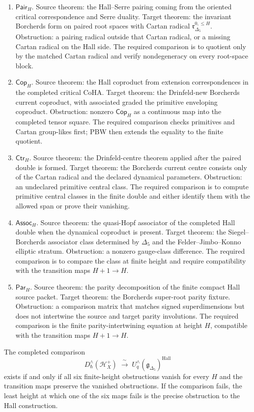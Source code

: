\begin{theorem}
\begin{enumerate}[label=\textup{(\roman*)}]
missing Serre-kernel class in the associated graded. The required comparison is to
identify primitive Hall generators root-by-root and prove that the
kernel is the finite-height Borcherds--Serre ideal.
\item \(\mathsf{Pair}_H\). Source theorem: the Hall--Serre pairing
coming from the oriented critical correspondence and Serre duality.
Target theorem: the invariant Borcherds form on paired root spaces with
Cartan radical \(\mathfrak r^{0,\leq H}_{\Delta_5}\). Obstruction: a
pairing radical outside that Cartan radical, or a missing Cartan radical
on the Hall side. The required comparison is to quotient only by the matched Cartan
radical and verify nondegeneracy on every root-space block.
\item \(\mathsf{Cop}_H\). Source theorem: the Hall coproduct from
extension correspondences in the completed critical CoHA. Target
theorem: the Drinfeld-new Borcherds current coproduct, with associated
graded the primitive enveloping coproduct. Obstruction: nonzero
\(\mathsf{Cop}_H\) as a continuous map into the completed tensor square.
The required comparison checks primitives and Cartan group-likes first; PBW then
extends the equality to the finite quotient.
\item \(\mathsf{Ctr}_H\). Source theorem: the Drinfeld-centre theorem
applied after the paired double is formed. Target theorem: the
Borcherds current centre consists only of the Cartan radical and the
declared dynamical parameters. Obstruction: an undeclared primitive
central class. The required comparison is to compute primitive central classes in the
finite double and either identify them with the allowed span or prove
their vanishing.
\item \(\mathsf{Assoc}_H\). Source theorem: the quasi-Hopf associator
of the completed Hall double when the dynamical coproduct is present.
Target theorem: the Siegel--Borcherds associator class determined by
\(\Delta_5\) and the Felder--Jimbo--Konno elliptic stratum. Obstruction:
a nonzero gauge-class difference. The required comparison is to compare the class at
finite height and require compatibility with the transition maps
\(H+1\to H\).
\item \(\mathsf{Par}_H\). Source theorem: the parity decomposition of
the finite compact Hall source packet. Target theorem: the Borcherds
super-root parity fixture. Obstruction: a comparison matrix that matches
signed superdimensions but does not intertwine the source and target
parity involutions. The required comparison is the finite
parity-intertwining equation at height \(H\), compatible with the
transition maps \(H+1\to H\).
\end{enumerate}
The completed comparison
\[
 D^\wedge_\hbar(\mathcal H^+_{X})
 \;\xrightarrow{\;\sim\;}\;
 U_q^\wedge(\mathfrak g_{\Delta_5})^{\mathrm{Hall}}
\]
exists if and only if all six finite-height obstructions vanish for
every \(H\) and the transition maps preserve the vanished obstructions.
If the comparison fails, the least height at which one of the six maps
fails is the precise obstruction to the Hall construction.
\end{theorem}

